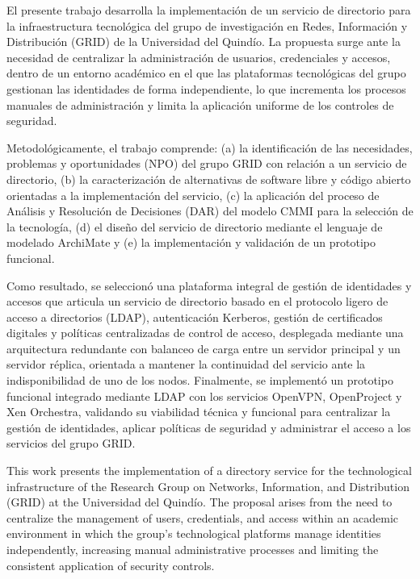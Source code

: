 \vspace*{0.7cm}

El presente trabajo desarrolla la implementación de un servicio de directorio para la infraestructura tecnológica del grupo de investigación en Redes, Información y Distribución (GRID) de la Universidad del Quindío. La propuesta surge ante la necesidad de centralizar la administración de usuarios, credenciales y accesos, dentro de un entorno académico en el que las plataformas tecnológicas del grupo gestionan las identidades de forma independiente, lo que incrementa los procesos manuales de administración y limita la aplicación uniforme de los controles de seguridad.

Metodológicamente, el trabajo comprende: (a) la identificación de las necesidades, problemas y oportunidades (NPO) del grupo GRID con relación a un servicio de directorio, (b) la caracterización de alternativas de software libre y código abierto orientadas a la implementación del servicio, (c) la aplicación del proceso de Análisis y Resolución de Decisiones (DAR) del modelo CMMI para la selección de la tecnología, (d) el diseño del servicio de directorio mediante el lenguaje de modelado ArchiMate y (e) la implementación y validación de un prototipo funcional.

Como resultado, se seleccionó una plataforma integral de gestión de identidades y accesos que articula un servicio de directorio basado en el protocolo ligero de acceso a directorios (LDAP), autenticación Kerberos, gestión de certificados digitales y políticas centralizadas de control de acceso, desplegada mediante una arquitectura redundante con balanceo de carga entre un servidor principal y un servidor réplica, orientada a mantener la continuidad del servicio ante la indisponibilidad de uno de los nodos. Finalmente, se implementó un prototipo funcional integrado mediante LDAP con los servicios OpenVPN, OpenProject y Xen Orchestra, validando su viabilidad técnica y funcional para centralizar la gestión de identidades, aplicar políticas de seguridad y administrar el acceso a los servicios del grupo GRID.

\vspace*{0.7cm}

This work presents the implementation of a directory service for the technological infrastructure of the Research Group on Networks, Information, and Distribution (GRID) at the Universidad del Quindío. The proposal arises from the need to centralize the management of users, credentials, and access within an academic environment in which the group’s technological platforms manage identities independently, increasing manual administrative processes and limiting the consistent application of security controls.

